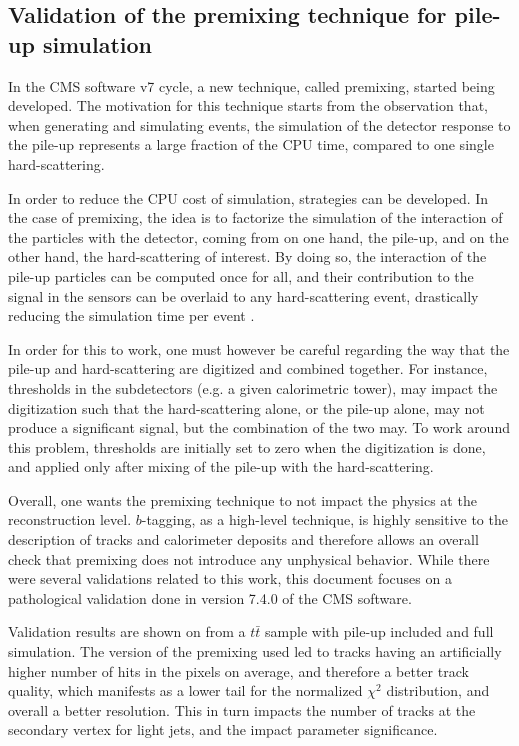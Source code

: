     \subsection{Validation of the premixing technique for pile-up simulation}

    In the CMS software v7 cycle, a new technique, called premixing, started being developed.
    The motivation for this technique starts from the observation that, when generating and
    simulating events, the simulation of the detector response to the pile-up represents
    a large fraction of the CPU time, compared to one single hard-scattering.

    In order to reduce the CPU cost of simulation, strategies can be developed. In the
    case of premixing, the idea is to factorize the simulation of the interaction of the particles with the
    detector, coming from on one hand, the pile-up, and on the other hand, the hard-scattering
    of interest. By doing so, the interaction of the pile-up particles can be computed once for
    all, and their contribution to the signal in the sensors can be overlaid to any
    hard-scattering event, drastically reducing the simulation time per event \cite{Premixing}.

    In order for this to work, one must however be careful regarding the way that the
    pile-up and hard-scattering are digitized and combined together. For instance,
    thresholds in the subdetectors (e.g. a given calorimetric tower), may
    impact the digitization such that the hard-scattering alone, or the pile-up alone,
    may not produce a significant signal, but the combination of the two may. To
    work around this problem, thresholds are initially set to zero when the digitization
    is done, and applied only after mixing of the pile-up with the hard-scattering.

    Overall, one wants the premixing technique to not impact the physics at the reconstruction
    level. $b$-tagging, as a high-level technique, is highly sensitive to the description
    of tracks and calorimeter deposits and therefore allows an overall check that premixing does
    not introduce any unphysical behavior. While there were several validations related to
    this work, this document focuses on a pathological validation done in version 7.4.0
    of the CMS software.

    Validation results are shown on  from
    a $t\bar{t}$ sample with pile-up included and full simulation. The version of the
    premixing used led to tracks having an artificially higher number of hits in the
    pixels on average, and therefore a better track quality, which manifests as a lower
    tail for the normalized $\chi^2$ distribution, and overall a better resolution.
    This in turn impacts the number of tracks at the secondary vertex for light jets, and the
    impact parameter significance.

